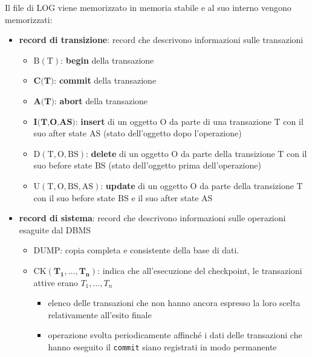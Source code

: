 Il file di LOG viene memorizzato in memoria stabile e al suo interno vengono memorizzati:
\begin{itemize}[label=$\triangleright$, itemsep=\medskipamount]
  \item \textbf{record di transizione}: record che descrivono informazioni sulle transazioni
  \begin{itemize}[label=$\diamond$, itemsep=\smallskipamount]
    \item $\boldsymbol{\mathrm{B(T)}}$: \textcolor{azzurrino}{\textbf{begin}} della transazione
    \item $\boldsymbol{\textbf{C(T)}}$: \textcolor{azzurrino}{\textbf{commit}} della transazione
    \item $\boldsymbol{\textbf{A(T)}}$: \textcolor{azzurrino}{\textbf{abort}} della transazione
    \item $\boldsymbol{\textbf{I(T,O,AS)}}$: \textcolor{azzurrino}{\textbf{insert}} di un oggetto $\mathrm{O}$ da parte di una transazione $\mathrm{T}$ con il suo after state $\mathrm{AS}$ (stato dell'oggetto dopo l'operazione)
    \item $\boldsymbol{\mathrm{D(T,O,BS)}}$: \textcolor{azzurrino}{\textbf{delete}} di un oggetto $\mathrm{O}$ da parte della transizione $\mathrm{T}$ con il suo before state $\mathrm{BS}$ (stato dell'oggetto prima dell'operazione)
    \item $\boldsymbol{\mathrm{U(T,O,BS,AS)}}$: \textcolor{azzurrino}{\textbf{update}} di un oggetto $\mathrm{O}$ da parte della transizione $\mathrm{T}$ con il suo before state $\mathrm{BS}$ e il suo after state $\mathrm{AS}$
  \end{itemize}
  \item \textbf{record di sistema}: record che descrivono informazioni sulle operazioni esaguite dal DBMS
  \begin{itemize}[label=$\circ$, itemsep=\smallskipamount]
    \item $\boldsymbol{\mathrm{DUMP}}$: copia completa e consistente della base di dati.
    \item $\boldsymbol{\mathrm{CK}(T_1, \dots, T_n)}$: indica che all'esecuzione del checkpoint, le transazioni attive erano $T_1, \dots, T_n$
    \begin{itemize}[itemsep=\smallskipamount]
      \item elenco delle transazioni che non hanno ancora espresso la loro scelta relativamente all'esito finale
      \item operazione svolta periodicamente affinché i dati delle transazioni che hanno eseguito il \texttt{commit} siano registrati in modo permanente

\end{itemize}
\end{itemize}
\end{itemize}
